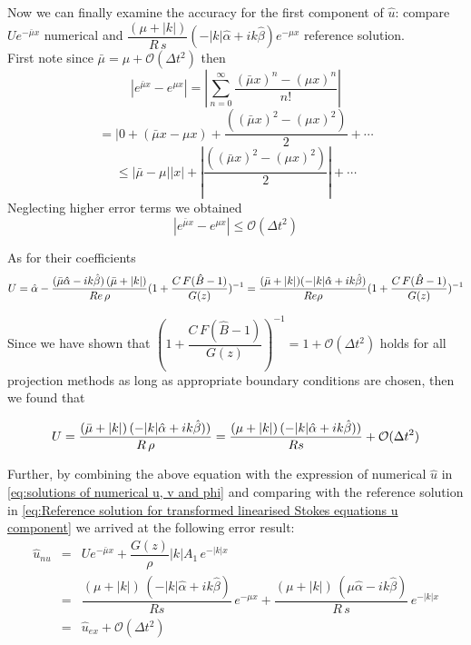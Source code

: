 Now we can finally examine the accuracy for the first component of $\hat{u}$: compare 
$U e^{-\bar{\mu} x}$ numerical and $\dfrac{(\mu + |k|)}{R \,s} (- |k| \hat{\alpha} + ik \hat{\beta}) e^{-\mu x}$ reference solution.\\

First note since $\bar{\mu} = \mu + \mathcal{O} (\Delta t^2)$ then
\begin{equation*}
| e^{\bar{\mu}x} - e^{\mu x} | = | \sum_{n=0}^{\infty} \dfrac{(\bar{\mu} x)^n - (\mu x)^n}{n!} |
\end{equation*}
\begin{equation*}
= | 0 + (\bar{\mu}x - \mu x) + \dfrac{((\bar{\mu} x)^2 - (\mu x)^2)}{2} + \cdots
\end{equation*}
\begin{equation*}
\leq |\bar{\mu} - \mu| |x| + |\dfrac{((\bar{\mu} x)^2 - (\mu x)^2)}{2}| + \cdots
\end{equation*}
Neglecting higher error terms we obtained
\begin{equation*}
| e^{\bar{\mu}x} - e^{\mu x} | \leq \mathcal{O} (\Delta t^2)
\end{equation*}

As for their coefficients\\
\begin{equation*}
U = \hat{\alpha} - \dfrac{(\bar{\mu} \hat{\alpha} - ik \hat{\beta}) \, (\bar{\mu} + |k|)}{Re \, \rho} (1 + \dfrac{C\,F(\hat{B} - 1)}{G(z)})^{-1}
=\\
\dfrac{(\bar{\mu} + |k|) (-|k| \hat{\alpha} + ik \hat{\beta})}{Re \rho} (1 + \dfrac{C\,F(\hat{B} - 1)}{G(z)})^{-1}
\end{equation*}

Since we have shown that $(1 + \dfrac{C\,F(\hat{B} - 1)}{G(z)})^{-1} = 1 + \mathcal{O}(\Delta t^2)$ holds for all projection methods as long as appropriate boundary conditions are chosen, then we found that

\begin{equation}
U = \dfrac{(\bar{\mu} + |k|)\,(- |k|\hat{\alpha}+ik\hat{\beta}))}{R\,\rho} = \\
\dfrac{(\mu+|k|)\,(- |k|\hat{\alpha}+ik\hat{\beta}))}{Rs}+\mathcal{O}(\Delta t^2)
\end{equation}

Further, by combining the above equation with the expression of numerical $\hat{u}$ in \eqref{eq:solutions of numerical u, v and phi} and comparing with the reference solution in \eqref{eq:Reference solution for transformed linearised Stokes equations u component} we arrived at the following error result:
\begin{eqnarray*}
\hat{u}_{nu} &=& U e^{-\bar{\mu}x} + \dfrac{G(z)}{\rho}|k|A_1\,e^{-|k|x} \\
&=& \dfrac{(\mu+|k|)\,(-|k|\hat{\alpha}+ik\hat{\beta})}{Rs}\,e^{-\mu x} + \dfrac{(\mu+|k|)\,(\mu \hat{\alpha} - ik\hat{\beta})}{R\,s}\,e^{-|k|x} \\
&=&
\hat{u}_{ex} + \mathcal{O} (\Delta t^2)
\end{eqnarray*}

